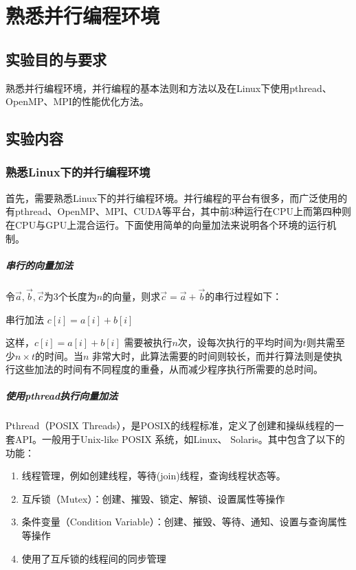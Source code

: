 \chapter{熟悉并行编程环境}
\section{实验目的与要求}
\par 熟悉并行编程环境，并行编程的基本法则和方法以及在Linux下使用pthread、OpenMP、MPI的性能优化方法。

\section{实验内容}
\subsection{熟悉Linux下的并行编程环境}
\label{sub:shou_xi_linuxxia_de_bing_xing_bian_cheng_huan_jing_}
\par 首先，需要熟悉Linux下的并行编程环境。并行编程的平台有很多，而广泛使用的有pthread、OpenMP、MPI、CUDA等平台，其中前3种运行在CPU上而第四种则在CPU与GPU上混合运行。下面使用简单的向量加法来说明各个环境的运行机制。

\paragraph{串行的向量加法}
\label{par:chuan_xing_de_xiang_liang_jia_fa_}
\par 令\(\vec{a}, \vec{b}, \vec{c}\)为3个长度为\(n\)的向量，则求\(\vec{c} = \vec{a} + \vec{b}\)的串行过程如下：
\begin{simpleAlgorithm}{串行加法}
    \State \(c[i] = a[i] + b[i]\)
    \EndFor
    \EndProcedure
\end{simpleAlgorithm}

\par 这样，\(c[i] = a[i] + b[i]\) 需要被执行\(n\)次，设每次执行的平均时间为\(t\)则共需至少\(n\times t\)的时间。当\(n\) 非常大时，此算法需要的时间则较长，而并行算法则是使执行这些加法的时间有不同程度的重叠，从而减少程序执行所需要的总时间。

\paragraph{使用pthread执行向量加法}
\label{par:shi_yong_pthreadzhi_xing_xiang_liang_jia_fa_}
\par Pthread（POSIX Threads），是POSIX的线程标准，定义了创建和操纵线程的一套API。一般用于Unix-like POSIX 系统，如Linux、 Solaris。其中包含了以下的功能：
\begin{enumerate}
    \item 线程管理，例如创建线程，等待(join)线程，查询线程状态等。
    \item 互斥锁（Mutex）：创建、摧毁、锁定、解锁、设置属性等操作
    \item 条件变量（Condition Variable）：创建、摧毁、等待、通知、设置与查询属性等操作
    \item 使用了互斥锁的线程间的同步管理
\end{enumerate}

